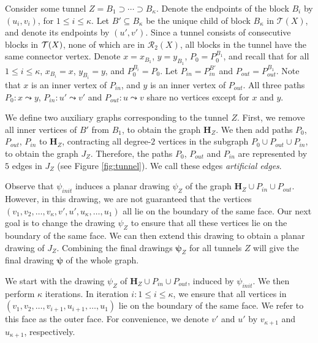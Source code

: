 \documentclass[twoside,leqno,twocolumn]{article}
\newcommand{\connect}{\leadsto}
\newcommand{\sse}{\subseteq}
\newcommand{\tset}{{\mathcal T}}
\newcommand{\rset}{{\mathcal{R}}}
\renewcommand{\H}{{\mathbf{H}}}
\newcommand{\bpsi}{{\boldsymbol{\psi}}}
\begin{document}
Consider some tunnel $Z=B_1\supset\cdots\supset B_{\kappa}$. Denote the endpoints of the block $B_i$ by $(u_i,v_i)$, for $1\leq i\leq 
\kappa$.
Let $B'\sse B_{\kappa}$ be the unique child of block $B_{\kappa}$ in $\tset(X)$, and denote its endpoints by $(u',v')$. Since a tunnel consists of consecutive blocks in ${\cal T}(X)$, none of which
are in $\rset_2(X)$, all blocks in the tunnel have the same connector vertex.
Denote $x = x_{B_1}$, $y=y_{B_1}$, $P_0 = P_0^{B_1}$, and recall that for all $1\leq i\leq \kappa$, $x_{B_i}=x$, $y_{B_i}=y$, and $P_0^{B_i}=P_0$. Let
$P_{in}=P_{in}^{B'}$ and $P_{out} = P_{out}^{B_1}$.
Note that $x$ is an inner vertex of $P_{in}$, and $y$ is an inner vertex of $P_{out}$.
All three paths $P_0:x\connect y$, $P_{in}:u'\connect v'$ and $P_{out}:u\connect v$ share no vertices except for $x$ and $y$.

We define two auxiliary graphs corresponding to the tunnel $Z$. First, we remove all inner vertices of $B'$ from $B_1$, to obtain the graph $\H_Z$. 
We then add paths $P_0$, $P_{out}$, $P_{in}$ to $\H_Z$, contracting all degree-$2$ vertices
in the subgraph $P_0 \cup P_{out} \cup P_{in}$, to obtain the graph $J_Z$.
Therefore, the paths $P_0$, $P_{out}$ and $P_{in}$ are represented by $5$ edges in $J_Z$ (see Figure \ref{fig:tunnel}).
We call these edges \textit{artificial edges}. 



Observe that $\psi_{init}$ induces a planar drawing $\psi_Z$ of the graph $\H_Z\cup P_{in}\cup P_{out}$. However, in this drawing, we are not guaranteed that the vertices $(v_1,v_2,\ldots,v_{\kappa},v',u',u_{\kappa},\ldots,u_1)$ all lie on the boundary of the same face. Our next goal is to change the drawing $\psi_Z$ to ensure that all these vertices lie on the boundary of the same face. We can then extend this drawing to obtain a planar drawing of $J_Z$. Combining the final drawings $\bpsi_Z$ for all tunnels $Z$ will give the final drawing $\bpsi$ of the whole graph.

We start with the drawing $\psi_Z$ of $\H_Z\cup P_{in}\cup P_{out}$, induced by $\psi_{init}$. We then perform $\kappa$ iterations. In iteration $i: 1\leq i\leq \kappa$, we ensure that  all vertices in $(v_1,v_2,\ldots,v_{i+1},u_{i+1},\dots,u_1)$ lie on the boundary of the same face. We refer to this face as the outer face. For convenience, we denote $v'$ and $u'$ by $v_{\kappa+1}$ and $u_{\kappa+1}$, respectively.
\end{document}
